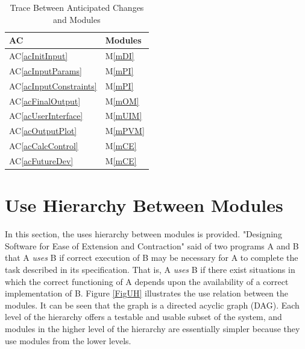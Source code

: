\documentclass[12pt, titlepage]{article}
\newcommand{\acref}[1]{AC\ref{#1}}
\newcommand{\mref}[1]{M\ref{#1}}
\begin{document}
\begin{table}[H]
\centering
\begin{tabular}{p{} p{}}
\toprule
\textbf{AC} & \textbf{Modules}\\
\midrule
\acref{acInitInput} & \mref{mDI}\\
\acref{acInputParams} & \mref{mPI}\\
\acref{acInputConstraints} & \mref{mPI}\\
\acref{acFinalOutput} & \mref{mOM}\\
\acref{acUserInterface} & \mref{mUIM}\\
\acref{acOutputPlot} & \mref{mPVM}\\
\acref{acCalcControl} & \mref{mCE}\\
\acref{acFutureDev} & \mref{mCE}\\
\bottomrule
\end{tabular}
\caption{Trace Between Anticipated Changes and Modules}
\label{TblACT}
\end{table}

\section{Use Hierarchy Between Modules} \label{SecUse}

In this section, the uses hierarchy between modules is
provided. "Designing Software for Ease of Extension and Contraction" said of two programs A and B that A {\em uses} B if
correct execution of B may be necessary for A to complete the task described in
its specification. That is, A {\em uses} B if there exist situations in which
the correct functioning of A depends upon the availability of a correct
implementation of B.  Figure \ref{FigUH} illustrates the use relation between
the modules. It can be seen that the graph is a directed acyclic graph
(DAG). Each level of the hierarchy offers a testable and usable subset of the
system, and modules in the higher level of the hierarchy are essentially simpler
because they use modules from the lower levels.
\end{document}
